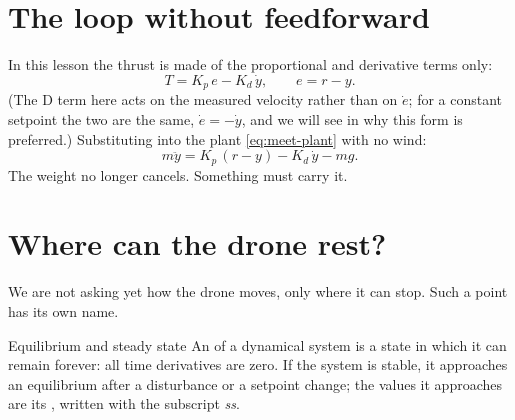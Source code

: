 \label{les:droop}


\section{The loop without feedforward}

In this lesson the thrust is made of the proportional and derivative terms only:
\begin{equation}
  T = K_p\,e - K_d\,\dot y ,\qquad e = r - y .
\end{equation}
(The D term here acts on the measured velocity rather than on $\dot e$; for a constant setpoint the two are the same, $\dot e = -\dot y$, and we will see in  why this form is preferred.) Substituting into the plant \eqref{eq:meet-plant} with no wind:
\begin{equation}\label{eq:droop-loop}
  m\ddot y = K_p\,(r - y) - K_d\,\dot y - m g .
\end{equation}
The weight no longer cancels. Something must carry it.

\section{Where can the drone rest?}

We are not asking yet how the drone moves, only where it can stop. Such a point has its own name.

\begin{definition}{Equilibrium and steady state}
An  of a dynamical system is a state in which it can remain forever: all time derivatives are zero. If the system is stable, it approaches an equilibrium after a disturbance or a setpoint change; the values it approaches are its , written with the subscript \emph{ss}.
\end{definition}

